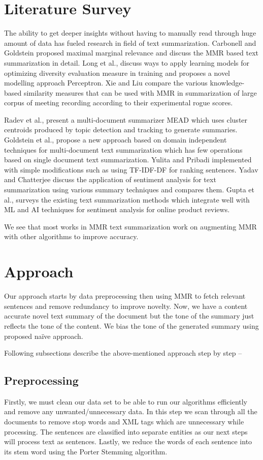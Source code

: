 \documentclass[conference]{IEEEtran}
\begin{document}
\section{Literature Survey}
    The ability to get deeper insights without having to manually read through huge amount of data has fueled research in field of text summarization. Carbonell and Goldstein \citep{paper1} proposed maximal marginal relevance and discuss the MMR based text summarization in detail. Long et al., \citep{paper2} discuss ways to apply learning models for optimizing diversity evaluation measure in training and proposes a novel modelling approach Perceptron. Xie and Liu\citep{paper3} compare the various knowledge-based similarity measures that can be used with MMR in summarization of large corpus of meeting recording according to their experimental rogue scores.
    \par
    Radev et al., \citep{paper4} present a multi-document summarizer MEAD which uses cluster centroids produced by topic detection and tracking to generate summaries. Goldstein et al., \citep{paper5} propose a new approach based on domain independent techniques for multi-document text summarization which has few operations based on single document text summarization. Yulita and Pribadi \citep{paper6} implemented \citep{paper1} with simple modifications such as using TF-IDF-DF for ranking sentences. Yadav and Chatterjee \citep{paper7} discuss the application of sentiment analysis for text summarization using various summary techniques and compares them. Gupta et al., \citep{paper8} surveys the existing text summarization methods which integrate well with ML and AI techniques for sentiment analysis for online product reviews.
    \par
    We see that most works in MMR text summarization work on augmenting MMR with other algorithms to improve accuracy. 

\section{Approach}
Our approach starts by data preprocessing then using MMR to fetch relevant sentences and remove redundancy to improve novelty. Now, we have a content accurate novel text summary of the document but the tone of the summary just reflects the tone of the content. We bias the tone of the generated summary using proposed naïve approach. \par
Following subsections describe the above-mentioned approach step by step – 
\subsection{Preprocessing}
Firstly, we must clean our data set to be able to run our algorithms efficiently and remove any unwanted/unnecessary data. In this step we scan through all the documents to remove stop words and XML tags which are unnecessary while processing. The sentences are classified into separate entities as our next steps will process text as sentences. Lastly, we reduce the words of each sentence into its stem word using the Porter Stemming algorithm.
\end{document}
